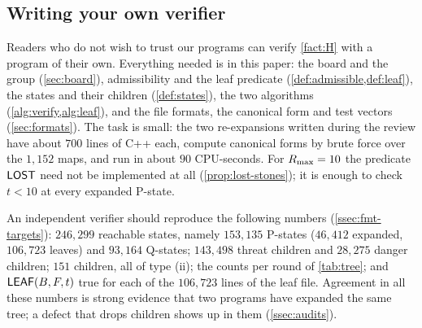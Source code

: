 \subsection{Writing your own verifier}\label{ssec:own}

Readers who do not wish to trust our programs can verify \cref{fact:H} with a program of
their own. Everything needed is in this paper: the board and the group (\cref{sec:board}), admissibility and
the leaf predicate (\cref{def:admissible,def:leaf}), the states and their children (\cref{def:states}), the
two algorithms (\cref{alg:verify,alg:leaf}), and the file formats, the canonical form and test vectors
(\cref{sec:formats}). The task is small: the two re-expansions written during the review have about $700$
lines of C++ each, compute canonical forms by brute force over the $1{,}152$ maps, and run in about $90$
CPU-seconds. For $R_{\max}=10$ the predicate $\mathsf{LOST}$ need not be implemented at all
(\cref{prop:lost-stones}); it is enough to check $t<10$ at every expanded P-state.

An independent verifier should reproduce the following numbers (\cref{ssec:fmt-targets}): $246{,}299$
reachable states, namely $153{,}135$ P-states ($46{,}412$ expanded, $106{,}723$ leaves) and $93{,}164$
Q-states; $143{,}498$ threat children and $28{,}275$ danger children; $151$ \VOID{} children, all of type
(ii); the counts per round of \cref{tab:tree}; and $\mathsf{LEAF}(B,F,t)$ true for each of the $106{,}723$ lines of
the leaf file. Agreement in all these numbers is strong evidence that two programs have expanded the
same tree; a defect that drops children shows up in them (\cref{ssec:audits}).
